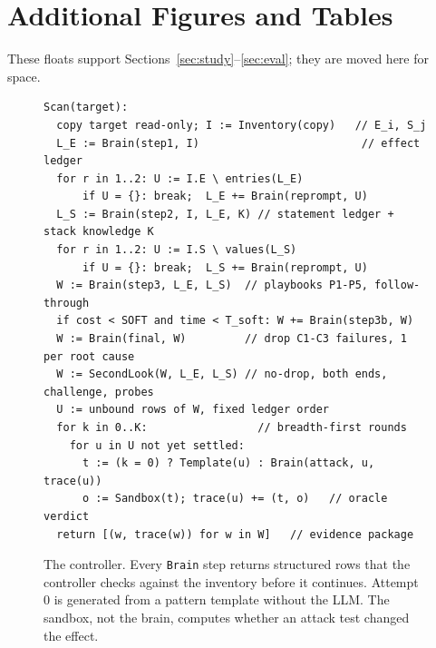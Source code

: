 \section{Additional Figures and Tables}\label{app:extra}
These floats support Sections~\ref{sec:study}--\ref{sec:eval}; they are
moved here for space.

\begin{figure}[!htb]
\begin{lstlisting}[mathescape]
Scan(target):
  copy target read-only; I := Inventory(copy)   // E_i, S_j
  L_E := Brain(step1, I)                         // effect ledger
  for r in 1..2: U := I.E \ entries(L_E)
      if U = {}: break;  L_E += Brain(reprompt, U)
  L_S := Brain(step2, I, L_E, K) // statement ledger + stack knowledge K
  for r in 1..2: U := I.S \ values(L_S)
      if U = {}: break;  L_S += Brain(reprompt, U)
  W := Brain(step3, L_E, L_S)  // playbooks P1-P5, follow-through
  if cost < SOFT and time < T_soft: W += Brain(step3b, W)
  W := Brain(final, W)         // drop C1-C3 failures, 1 per root cause
  W := SecondLook(W, L_E, L_S) // no-drop, both ends, challenge, probes
  U := unbound rows of W, fixed ledger order
  for k in 0..K:                 // breadth-first rounds
    for u in U not yet settled:
      t := (k = 0) ? Template(u) : Brain(attack, u, trace(u))
      o := Sandbox(t); trace(u) += (t, o)   // oracle verdict
  return [(w, trace(w)) for w in W]   // evidence package
\end{lstlisting}
\caption{The \tool{} controller. Every \texttt{Brain} step returns
structured rows that the controller checks against the inventory
before it continues. Attempt 0 is generated from a pattern template without
the LLM. The sandbox, not the brain, computes whether an attack test changed
the effect.}
\label{fig:controller}
\end{figure}


